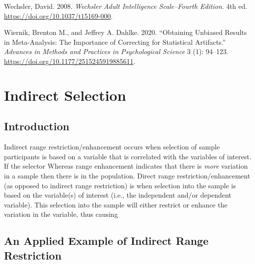 \documentclass[
  letterpaper,
  DIV=11,
  numbers=noendperiod]{scrreprt}
\newlength{\cslhangindent}
\newlength{\cslentryspacingunit} %
\newenvironment{CSLReferences}[2] %
 {%
  \setlength{\parindent}{0pt}
  \ifodd #1
  \let\oldpar\par
  \def\par{\hangindent=\cslhangindent\oldpar}
  \fi
  \setlength{\parskip}{#2\cslentryspacingunit}
 }%
 {}
\begin{document}
\begin{CSLReferences}{1}{0}
\leavevmode{}%
Wechsler, David. 2008. \emph{Wechsler Adult Intelligence Scale--Fourth
Edition}. 4th ed. \url{https://doi.org/10.1037/t15169-000}.

\leavevmode{}%
Wiernik, Brenton M., and Jeffrey A. Dahlke. 2020. {``Obtaining Unbiased
Results in Meta-Analysis: The Importance of Correcting for Statistical
Artifacts.''} \emph{Advances in Methods and Practices in Psychological
Science} 3 (1): 94--123. \url{https://doi.org/10.1177/2515245919885611}.

\end{CSLReferences}

\hypertarget{indirect-selection}{%
\chapter{Indirect Selection}\label{indirect-selection}}

\hypertarget{introduction-4}{%
\section{Introduction}\label{introduction-4}}

Indirect range restriction/enhancement occurs when selection of sample
participants is based on a variable that is correlated with the
variables of interest. If the selector Whereas range enhancement
indicates that there is \emph{more} variation in a sample then there is
in the population. Direct range restriction/enhancement (as opposed to
indirect range restriction) is when selection into the sample is based
on the variable(s) of interest (i.e., the independent and/or dependent
variable). This selection into the sample will either restrict or
enhance the variation in the variable, thus causing

\hypertarget{an-applied-example-of-indirect-range-restriction}{%
\section{An Applied Example of Indirect Range
Restriction}\label{an-applied-example-of-indirect-range-restriction}}
\end{document}
